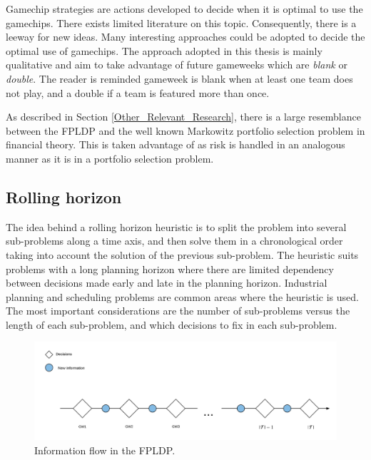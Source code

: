 \newpar

Gamechip strategies are actions developed to decide when it is optimal to use the gamechips.  There exists limited literature on this topic. Consequently, there is a leeway for new ideas. Many interesting approaches could be adopted to decide the optimal use of gamechips. The approach adopted in this thesis is mainly qualitative and aim to take advantage of future gameweeks which are \textit{blank} or \textit{double}. The reader is reminded gameweek is blank when at least one team does not play, and a double if a team is featured more than once. 

\newpar

As described in Section \ref{Other_Relevant_Research}, there is a large resemblance between the FPLDP and the well known Markowitz portfolio selection problem in financial theory. This is taken advantage of as risk is handled in an analogous manner as it is in a portfolio selection problem.


\subsection{Rolling horizon}

The idea behind a rolling horizon heuristic is to split the problem into several sub-problems along a time axis, and then solve them in a chronological order taking into account the solution of the previous sub-problem. The heuristic suits problems with a long planning horizon where there are limited dependency between decisions made early and late in the planning horizon. Industrial planning and scheduling problems are common areas where the heuristic is used. The most important considerations are the number of sub-problems versus the length of each sub-problem, and which decisions to fix in each sub-problem. 

\begin{figure}[H]
    \centering
    \includegraphics[scale = 0.47]{fig/chapter_5/Rolling_Horizon_Information_Flow.png}
    \caption{Information flow in the FPLDP.}
    \label{fig:information_flow}
\end{figure}

